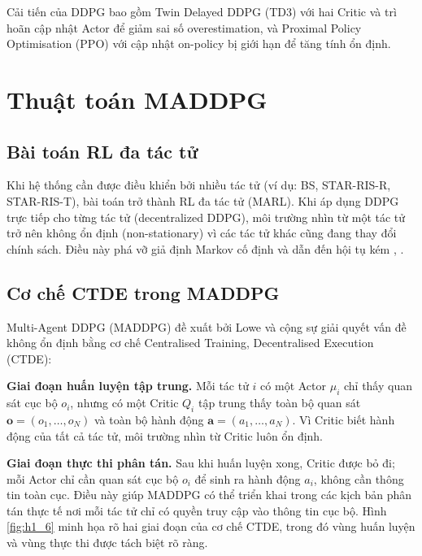 Cải tiến của DDPG bao gồm Twin Delayed DDPG (TD3)
\cite{fujimoto2018addressing} với hai Critic và trì hoãn cập nhật Actor để
giảm sai số overestimation, và Proximal Policy Optimisation (PPO)
\cite{schulman2017proximal} với cập nhật on-policy bị giới hạn để tăng
tính ổn định.

\section{Thuật toán MADDPG}
\label{sec:maddpg}

\subsection{Bài toán RL đa tác tử}

Khi hệ thống cần được điều khiển bởi nhiều tác tử (ví dụ: BS, STAR-RIS-R,
STAR-RIS-T), bài toán trở thành RL đa tác tử (MARL). Khi áp dụng DDPG
trực tiếp cho từng tác tử (decentralized DDPG), môi trường nhìn từ một
tác tử trở nên không ổn định (non-stationary) vì các tác tử khác
cũng đang thay đổi chính sách. Điều này phá vỡ giả định Markov cố định
và dẫn đến hội tụ kém \cite{lowe2017multi}, \cite{dange2026collaborative}.

\subsection{Cơ chế CTDE trong MADDPG}

Multi-Agent DDPG (MADDPG) đề xuất bởi Lowe và cộng sự
\cite{lowe2017multi} giải quyết vấn đề không ổn định bằng cơ chế
Centralised Training, Decentralised Execution (CTDE):

\textbf{Giai đoạn huấn luyện tập trung.} Mỗi tác tử $i$ có một
Actor $\mu_i$ chỉ thấy quan sát cục bộ $o_i$, nhưng có một
Critic $Q_i$ tập trung thấy toàn bộ quan sát
$\mathbf{o} = (o_1, \ldots, o_N)$ và toàn bộ hành động
$\mathbf{a} = (a_1, \ldots, a_N)$. Vì Critic biết hành động của tất cả
tác tử, môi trường nhìn từ Critic luôn ổn định.

\textbf{Giai đoạn thực thi phân tán.} Sau khi huấn luyện xong, Critic
được bỏ đi; mỗi Actor chỉ cần quan sát cục bộ $o_i$ để sinh ra hành
động $a_i$, không cần thông tin toàn cục. Điều này giúp MADDPG có thể
triển khai trong các kịch bản phân tán thực tế nơi mỗi tác tử chỉ có
quyền truy cập vào thông tin cục bộ. Hình \ref{fig:h1_6} minh họa rõ
hai giai đoạn của cơ chế CTDE, trong đó vùng huấn luyện và vùng thực
thi được tách biệt rõ ràng.

